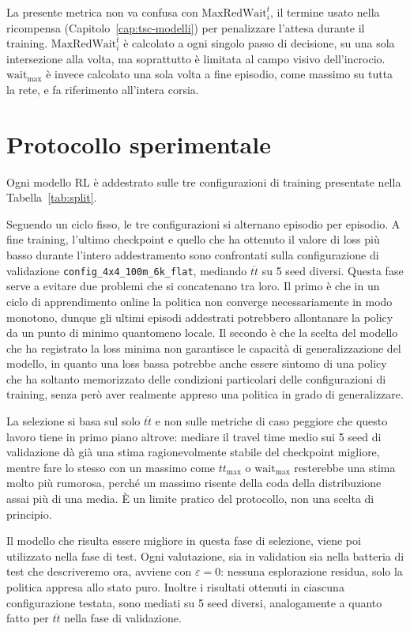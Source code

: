 La presente metrica non va confusa con $\mathrm{MaxRedWait}_i^t$, il termine
usato nella ricompensa (Capitolo~\ref{cap:tsc-modelli}) per
penalizzare l'attesa durante il training. $\mathrm{MaxRedWait}_i^t$ è
calcolato a ogni singolo passo di decisione, su una sola intersezione alla
volta, ma soprattutto è limitata al campo visivo dell'incrocio.
$\text{wait}_{\max}$ è invece calcolato una sola volta a fine
episodio, come massimo su tutta la rete, e fa riferimento all'intera corsia.

\section{Protocollo sperimentale}
\label{sec:protocollo}

Ogni modello RL è addestrato sulle tre configurazioni di training presentate nella Tabella~\ref{tab:split}.

Seguendo un ciclo fisso, le tre configurazioni si alternano episodio per
episodio. A fine training, l'ultimo checkpoint e quello che ha ottenuto il
valore di loss più basso durante l'intero addestramento sono confrontati
sulla configurazione di validazione \texttt{config\_4x4\_100m\_6k\_flat},
mediando $\overline{tt}$ su 5 seed diversi.
Questa fase serve a evitare due problemi che si concatenano tra loro.
Il primo è che in un ciclo di
apprendimento online la politica non converge necessariamente in modo
monotono, dunque gli ultimi episodi addestrati potrebbero allontanare la policy da un
punto di minimo quantomeno locale.
Il secondo è che la scelta del modello che ha registrato la loss minima non garantisce
le capacità di generalizzazione del modello, in quanto una loss bassa potrebbe
anche essere sintomo di una policy che ha soltanto memorizzato delle condizioni particolari delle
configurazioni di training, senza però aver realmente appreso una politica in grado di generalizzare.

La selezione si basa sul solo $\overline{tt}$ e non sulle metriche di caso
peggiore che questo lavoro tiene in primo piano altrove: mediare il
travel time medio sui 5 seed di validazione dà già una stima
ragionevolmente stabile del checkpoint migliore, mentre fare lo stesso con
un massimo come $tt_{\max}$ o $\text{wait}_{\max}$ resterebbe una stima
molto più rumorosa, perché un massimo risente della coda della
distribuzione assai più di una media. È un limite pratico del protocollo,
non una scelta di principio.

Il modello che risulta essere migliore in questa fase di selezione, viene poi utilizzato nella fase di test.
Ogni valutazione, sia in validation sia nella batteria di test che descriveremo ora, avviene con $\varepsilon=0$:
nessuna esplorazione residua, solo la politica appresa allo stato puro. Inoltre i risultati ottenuti in ciascuna
configurazione testata, sono mediati su 5 seed diversi, analogamente a quanto fatto per $\overline{tt}$ nella fase di validazione.

